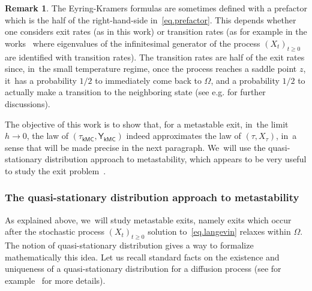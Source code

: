 \documentclass[JEP,XML,SOM,Unicode,NoEqCountersInSection,NoFloatCountersInSection,published]{cedram}
\theoremstyle{plain}
\theoremstyle{definition}
\newtheorem{remark}[proposition]{Remark}
\begin{document}
\begin{remark} The Eyring-Kramers formulas are sometimes defined with
a prefactor which is the half of the right-hand-side in~\eqref{eq.prefactor}. This depends
whether one considers exit rates (as in this work) or transition
rates (as for example in the works~\cite{BEGK,BGK} where eigenvalues
of the infinitesimal generator of the process $(X_t)_{t \ge 0}$ are
identified with transition rates). The transition rates are half of
the exit rates since, in~the small temperature regime,
once the process reaches a saddle point $z$, it~has a probability
$1/2$ to immediately come back to $\Omega$, and a probability $1/2$ to actually
make a transition to the neighboring state (see e.g. \cite[Rem.\,8]{IHPLLN}
for further discussions).
\end{remark}

The objective of this work is to show that, for a metastable exit, in~the limit $h \to 0$,
the law of $(\tau_{\mathsf {kMC}}, \mathsf Y_{\mathsf
{kMC}})$ indeed approximates the law of $(\tau, X_\tau)$, in~a
sense that will be made precise in the next paragraph. We~will use the
quasi-stationary distribution approach to metastability, which appears
to be very useful to study the exit problem~\cite{le2012mathematical,DLLN,bianchi2020soft}.

\subsubsection*{The quasi-stationary distribution approach to metastability}
As explained above, we~will study metastable exits, namely exits which
occur after the stochastic process $(X_t)_{t \ge 0}$ solution
to~\eqref{eq.langevin} relaxes within $\Omega$. The notion of
quasi-stationary distribution gives a way to formalize mathematically
this idea. Let us recall standard facts on the existence and uniqueness of a
quasi-stationary distribution for a diffusion process (see for
example~\cite{cattiaux-collet-lambert-martinez-meleard-san-martin-09,collet-martinez-san-martin-13}
for more details).
\end{document}
